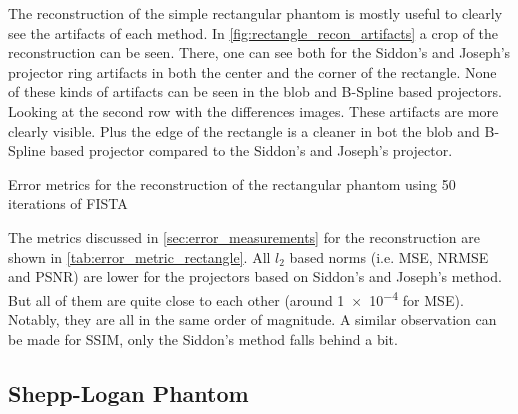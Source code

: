The reconstruction of the simple rectangular phantom is mostly useful to clearly see the artifacts
of each method. In \autoref{fig:rectangle_recon_artifacts} a crop of the reconstruction can be seen.
There, one can see both for the Siddon's and Joseph's projector ring artifacts in both the center
and the corner of the rectangle. None of these kinds of artifacts can be seen in the blob and
B-Spline based projectors. Looking at the second row with the differences images. These artifacts
are more clearly visible. Plus the edge of the rectangle is a cleaner in bot the blob and B-Spline
based projector compared to the Siddon's and Joseph's projector.

\begin{table}[h]%
	\centering
	\caption{Error metrics for the reconstruction of the rectangular phantom using 50 iterations
		of FISTA}%
	\label{tab:error_metric_rectangle}
\end{table}

The metrics discussed in \autoref{sec:error_measurements} for the reconstruction are shown in
\autoref{tab:error_metric_rectangle}. All \(l_2\) based norms (i.e. \gls{MSE}, \gls{NRMSE} and
\gls{PSNR}) are lower for the projectors based on Siddon's and Joseph's method. But all of them are
quite close to each other (around \num{1e-4} for \gls{MSE}). Notably, they are all in the same order
of magnitude. A similar observation can be made for \gls{SSIM}, only the Siddon's method falls
behind a bit.

\subsection{Shepp-Logan Phantom}

